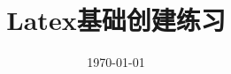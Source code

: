 \documentclass[UTF8]{article}
\title{Latex基础创建练习}
\begin{document}
\date{\today}

\maketitle
\end{document}
